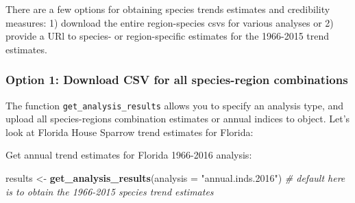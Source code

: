 \documentclass[12pt,twoside,openany]{reedthesis}
\newenvironment{Shaded}{\begin{snugshade}}{\end{snugshade}}
\newcommand{\CharTok}[1]{\textcolor[rgb]{0.31,0.60,0.02}{#1}}
\newcommand{\CommentTok}[1]{\textcolor[rgb]{0.56,0.35,0.01}{\textit{#1}}}
\newcommand{\DataTypeTok}[1]{\textcolor[rgb]{0.13,0.29,0.53}{#1}}
\newcommand{\KeywordTok}[1]{\textcolor[rgb]{0.13,0.29,0.53}{\textbf{#1}}}
\newcommand{\NormalTok}[1]{#1}
\newcommand{\OperatorTok}[1]{\textcolor[rgb]{0.81,0.36,0.00}{\textbf{#1}}}
\newcommand{\StringTok}[1]{\textcolor[rgb]{0.31,0.60,0.02}{#1}}
\begin{document}
There are a few options for obtaining species trends estimates and credibility measures: 1) download the entire region-species csvs for various analyses or 2) provide a URl to species- or region-specific estimates for the 1966-2015 trend estimates.

\hypertarget{option-1-download-csv-for-all-species-region-combinations}{%
\subsubsection{Option 1: Download CSV for all species-region combinations}\label{option-1-download-csv-for-all-species-region-combinations}}

The function \texttt{get\_analysis\_results} allows you to specify an analysis type, and upload all species-regions combination estimates or annual indices to object.
Let's look at Florida House Sparrow trend estimates for Florida:
\begin{Shaded}
\end{Shaded}
Get annual trend estimates for Florida 1966-2016 analysis:
\begin{Shaded}
\begin{Highlighting}[]
\NormalTok{results <-}\StringTok{ }\KeywordTok{get_analysis_results}\NormalTok{(}\DataTypeTok{analysis =} \StringTok{"annual.inds.2016"}\NormalTok{) }\CommentTok{# default here is to obtain the 1966-2015 species trend estimates}
\end{Highlighting}
\end{Shaded}
\begin{Shaded}
\end{Shaded}
\end{document}
